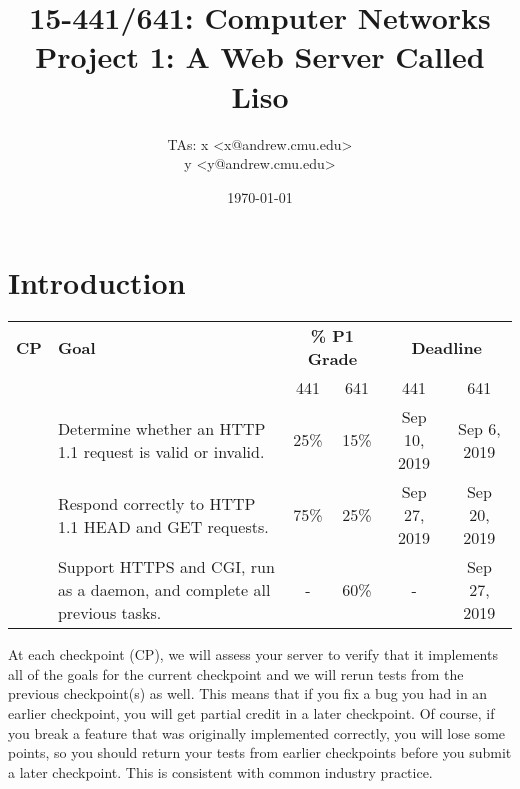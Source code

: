 \documentclass{article}
\begin{document}
\title{	15-441/641: Computer Networks\\
Project 1: A Web Server Called Liso\\
}

\author{TAs: x <x@andrew.cmu.edu> \\
y <y@andrew.cmu.edu>}
\date{\today}

\maketitle


\section{Introduction}


\begin{center}
\vspace{10pt}
\begin{tabular}{cp{2.5in}cccc}
  {\bf CP}&{\bf Goal}&\multicolumn{2}{c}{{\bf \% P1 Grade}}&\multicolumn{2}{c}{{\bf Deadline}}\\
  & & 441 & 641 & 441 & 641 \\

  \hline
  
  \addlinespace[5pt]
  1&Determine whether an HTTP 1.1 request is valid or invalid. & 25\% & 15\% & Sep 10, 2019 & Sep 6, 2019 \\
  
  \addlinespace[5pt]
  2&Respond correctly to HTTP 1.1 HEAD and GET requests. & 75\% & 25\% & Sep 27, 2019 & Sep 20, 2019   \\
  
  \addlinespace[5pt]
  3&Support HTTPS and CGI, run as a daemon, and complete all previous tasks. & - & 60\% & - & Sep 27, 2019\\
\end{tabular}
\end{center}

\noindent At each checkpoint (CP), we will assess your server to verify that it implements all of the goals for the current checkpoint 
and we will rerun tests from the previous checkpoint(s) as well. 
This means that if you fix a bug you had in an earlier checkpoint, you will get partial credit in a later checkpoint.  Of course, if you 
break a feature that was originally implemented correctly, you will lose some points, so you should return your tests from earlier 
checkpoints before you submit a later checkpoint.  This is consistent with common industry practice.
\end{document}
